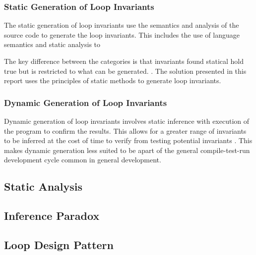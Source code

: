 \subsubsection{Static Generation of Loop Invariants}

The static generation of loop invariants use the
semantics and analysis of the source code to generate the loop invariants.
This includes the use of language semantics and static analysis to

The key difference between the categories is
that invariants found statical hold true
but is restricted to what can be generated.
\cite{benderfinding}\cite{Leino2005LoopIO}.
The solution presented in this report uses
the principles of static methods to generate loop invariants.

\subsubsection{Dynamic Generation of Loop Invariants}

Dynamic generation of loop invariants involves static inference
with execution of the program to confirm the results.
This allows for a greater range of invariants to be inferred
at the cost of time to verify from testing potential invariants
\cite{infer-dynamic} \cite{infer-postconditions}.
This makes dynamic generation less suited to be apart of
the general compile-test-run development cycle common in general development.

\subsection{Static Analysis}

\subsection{Inference Paradox}

\cite{infer-postconditions}

\subsection{Loop Design Pattern}


